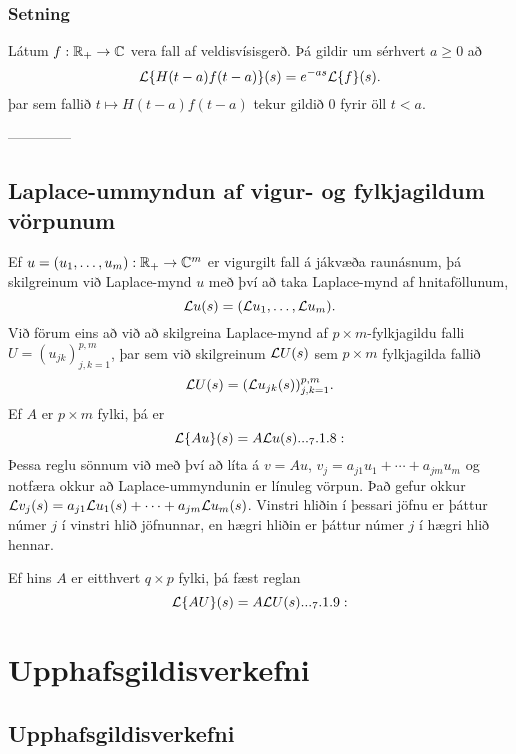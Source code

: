 \subsubsection{Setning}  Látum $f:{\mathbb R}_+\to {\mathbb C}$ vera fall af veldisvísisgerð.  Þá gildir um
sérhvert $a\geq 0$ að
$$
{\cal L}\{H(t-a)f(t-a)\}(s) = e^{-as}{\cal L}\{f\}(s).
$$
þar sem fallið $t\mapsto H(t-a)f(t-a)$ tekur gildið $0$ fyrir öll
$t<a$. 


--------------



\subsection*{Laplace-ummyndun af vigur- og fylkjagildum vörpunum}

Ef $u=(u_1,\dots,u_m): {\mathbb R}_+\to {\mathbb C}^m$ er vigurgilt fall á jákvæða
raunásnum, þá skilgreinum við Laplace-mynd $u$ með því að taka
Laplace-mynd af hnitaföllunum, 
$${\cal L} u(s)=({\cal L} u_1,\dots,{\cal L} u_m).
$$ 
Við
förum eins að við að skilgreina Laplace-mynd af $p\times m$-fylkjagildu
falli $U=(u_{jk})_{j,k=1}^{p,m}$, þar sem við skilgreinum ${\cal L} U(s)$ sem
$p\times m$ fylkjagilda fallið  
$${\cal L} U(s)=({\cal L} u_{jk}(s))_{j,k=1}^{p,m}.
$$
Ef $A$ er $p\times m$ fylki, þá er 
\begin{equation*}
\L\{Au\}(s)=A\L u(s).


.. _7.1.8:

\end{equation*}
Þessa reglu sönnum við  með því að líta á $v=Au$,
$v_j=a_{j1}u_1+\cdots+a_{jm}u_m$ og notfæra okkur að Laplace-ummyndunin
er línuleg vörpun.  Það gefur okkur ${\cal L} v_j(s)=a_{j1}{\cal L} u_1(s)+\cdots+a_{jm}{\cal L}
u_m(s)$.  Vinstri hliðin í þessari jöfnu er þáttur númer $j$ í vinstri
hlið jöfnunnar, en hægri hliðin er þáttur númer $j$ í hægri hlið hennar.


Ef hins $A$ er eitthvert $q\times p$ fylki, þá fæst reglan
\begin{equation*}
\L\{AU\}(s)=A\L U(s).


.. _7.1.9:

\end{equation*}



\section{Upphafsgildisverkefni}

\subsection{Upphafsgildisverkefni}

